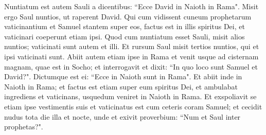 \begin{biblechapter}
\verse Nuntiatum est autem Sauli a dicentibus: “Ecce David in Naioth in Rama". 
\verse Misit ergo Saul nuntios, ut raperent David. Qui cum vidissent cuneum prophetarum vaticinantium et Samuel stantem super eos, factus est in illis spiritus Dei, et vaticinari coeperunt etiam ipsi. 
\verse Quod cum nuntiatum esset Sauli, misit alios nuntios; vaticinati sunt autem et illi. Et rursum Saul misit tertios nuntios, qui et ipsi vaticinati sunt. 
\verse Abiit autem etiam ipse in Rama et venit usque ad cisternam magnam, quae est in Socho; et interrogavit et dixit: “In quo loco sunt Samuel et David?". Dictumque est ei: “Ecce in Naioth sunt in Rama". 
\verse Et abiit inde in Naioth in Rama; et factus est etiam super eum spiritus Dei, et ambulabat ingrediens et vaticinans, usquedum veniret in Naioth in Rama. 
\verse Et exspoliavit se etiam ipse vestimentis suis et vaticinatus est cum ceteris coram Samuel; et cecidit nudus tota die illa et nocte, unde et exivit proverbium: “Num et Saul inter prophetas?". 
\end{biblechapter}

